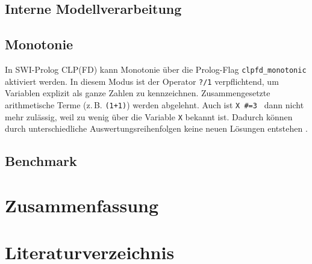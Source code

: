 \documentclass[12pt,a4paper]{article}
\begin{document}
\subsection{Interne Modellverarbeitung}
\subsection{Monotonie}
\label{sec:monotonie}

In SWI-Prolog CLP(FD) kann Monotonie über die Prolog-Flag \texttt{clpfd\_monotonic} aktiviert werden.  
In diesem Modus ist der Operator \texttt{?/1} verpflichtend, um Variablen explizit als ganze Zahlen zu kennzeichnen.
Zusammengesetzte arithmetische Terme (z.\,B. \texttt{(1+1)}) werden abgelehnt.
Auch ist \texttt{X \#=3 } dann nicht mehr zulässig, weil zu wenig über die Variable \texttt{X} bekannt ist.   
Dadurch können durch unterschiedliche Auswertungsreihenfolgen keine neuen Lösungen entstehen \cite{swi-clpfd-doc}.
\subsection{Benchmark}
\label{sec:performance}
\section{Zusammenfassung}
\section{Literaturverzeichnis}
\renewcommand*{\bibname}{} %
\renewcommand*{\refname}{} %
\printbibliography
\end{document}
